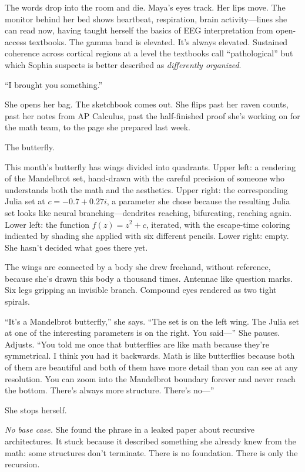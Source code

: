 The words drop into the room and die. Maya's eyes track. Her lips move. The monitor behind her bed shows heartbeat, respiration, brain activity---lines she can read now, having taught herself the basics of EEG interpretation from open-access textbooks. The gamma band is elevated. It's always elevated. Sustained coherence across cortical regions at a level the textbooks call ``pathological'' but which Sophia suspects is better described as \textit{differently organized}.

``I brought you something.''

She opens her bag. The sketchbook comes out. She flips past her raven counts, past her notes from AP Calculus, past the half-finished proof she's working on for the math team, to the page she prepared last week.

The butterfly.

This month's butterfly has wings divided into quadrants. Upper left: a rendering of the Mandelbrot set, hand-drawn with the careful precision of someone who understands both the math and the aesthetics. Upper right: the corresponding Julia set at $c = -0.7 + 0.27i$, a parameter she chose because the resulting Julia set looks like neural branching---dendrites reaching, bifurcating, reaching again. Lower left: the function $f(z) = z^2 + c$, iterated, with the escape-time coloring indicated by shading she applied with six different pencils. Lower right: empty. She hasn't decided what goes there yet.

The wings are connected by a body she drew freehand, without reference, because she's drawn this body a thousand times. Antennae like question marks. Six legs gripping an invisible branch. Compound eyes rendered as two tight spirals.

``It's a Mandelbrot butterfly,'' she says. ``The set is on the left wing. The Julia set at one of the interesting parameters is on the right. You said---'' She pauses. Adjusts. ``You told me once that butterflies are like math because they're symmetrical. I think you had it backwards. Math is like butterflies because both of them are beautiful and both of them have more detail than you can see at any resolution. You can zoom into the Mandelbrot boundary forever and never reach the bottom. There's always more structure. There's no---''

She stops herself.

\textit{No base case.} She found the phrase in a leaked paper about recursive architectures. It stuck because it described something she already knew from the math: some structures don't terminate. There is no foundation. There is only the recursion.

